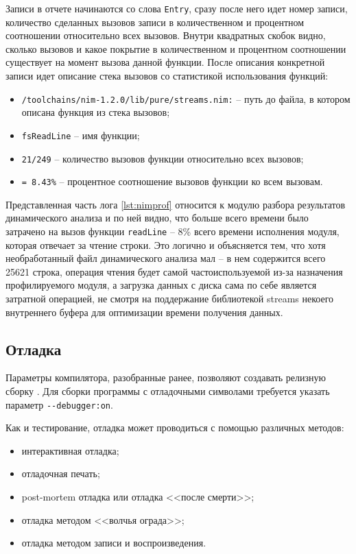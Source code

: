 Записи в отчете начинаются со слова \verb|Entry|, сразу после него идет номер
записи, количество сделанных вызовов записи в количественном и процентном
соотношении относительно всех вызовов. Внутри квадратных скобок видно, сколько
вызовов и какое покрытие в количественном и процентном соотношении существует на
момент вызова данной функции.
После описания конкретной записи идет описание стека вызовов со статистикой использования 
функций:
\begin{itemize}
    \item \verb|/toolchains/nim-1.2.0/lib/pure/streams.nim:| -- путь до файла, в котором 
        описана функция из стека вызовов;
    \item \verb|fsReadLine| -- имя функции;
    \item \verb|21/249| -- количество вызовов функции относительно всех вызовов;
    \item \verb|= 8.43%| -- процентное соотношение вызовов функции ко всем вызовам.
\end{itemize}

Представленная часть лога \autoref{lst:nimprof} относится к модулю разбора результатов
динамического анализа и по ней видно, что больше всего времени было затрачено на вызов 
функции \verb|readLine| -- 8\% всего времени исполнения модуля,
которая отвечает за чтение строки.
Это логично и объясняется тем, что хотя необработанный файл динамического анализа мал --
в нем содержится всего 25621 строка, операция чтения будет самой частоиспользуемой
из-за назначения профилируемого модуля, а загрузка данных с диска сама по себе
является затратной операцией, не смотря на поддержание библиотекой streams некоего
внутреннего буфера для оптимизации времени получения данных. 

\subsection{Отладка {\ProgModule}}\label{sec:ch3/sec1/sub4}
Параметры компилятора, разобранные ранее, 
позволяют создавать релизную сборку {\ProgModule}.
Для сборки программы с отладочными символами требуется 
указать параметр \verb|--debugger:on|.

Как и тестирование, отладка может проводиться с помощью
различных методов:
\begin{itemize}
    \item интерактивная отладка;
    \item отладочная печать;
    \item post-mortem отладка или отладка <<после смерти>>;
    \item отладка методом <<волчья ограда>>;
    \item отладка методом записи и воспроизведения.
\end{itemize}

